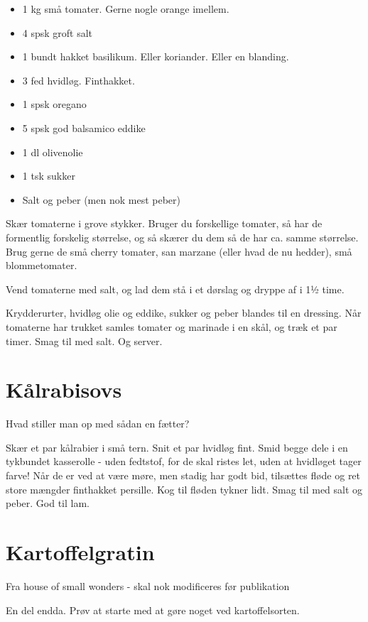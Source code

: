 \documentclass[
]{book}
\providecommand{\tightlist}{%
  \setlength{\itemsep}{0pt}\setlength{\parskip}{0pt}}
\begin{document}
\begin{itemize}
\tightlist
\item
  1 kg små tomater. Gerne nogle orange imellem.
\item
  4 spsk groft salt
\item
  1 bundt hakket basilikum. Eller koriander. Eller en blanding.
\item
  3 fed hvidløg. Finthakket.
\item
  1 spsk oregano
\item
  5 spsk god balsamico eddike
\item
  1 dl olivenolie
\item
  1 tsk sukker
\item
  Salt og peber (men nok mest peber)
\end{itemize}

Skær tomaterne i grove stykker. Bruger du forskellige tomater, så har de formentlig forskelig størrelse, og så skærer du dem så de har ca. samme størrelse. Brug gerne de små cherry tomater, san marzane (eller hvad de nu hedder), små blommetomater.

Vend tomaterne med salt, og lad dem stå i et dørslag og dryppe af i 1½ time.

Krydderurter, hvidløg olie og eddike, sukker og peber blandes til en dressing. Når tomaterne har trukket samles tomater og marinade i en skål, og træk et par timer. Smag til med salt. Og server.

\section{Kålrabisovs}\label{kuxe5lrabisovs}

Hvad stiller man op med sådan en fætter?

Skær et par kålrabier i små tern.
Snit et par hvidløg fint.
Smid begge dele i en tykbundet kasserolle - uden fedtstof, for de skal
ristes let, uden at hvidløget tager farve!
Når de er ved at være møre, men stadig har godt bid, tilsættes fløde og ret store
mængder finthakket persille. Kog til fløden tykner lidt. Smag til med salt og
peber. God til lam.

\section{Kartoffelgratin}\label{kartoffelgratin}

Fra house of small wonders - skal nok modificeres før publikation

En del endda. Prøv at starte med at gøre noget ved kartoffelsorten.
\end{document}
